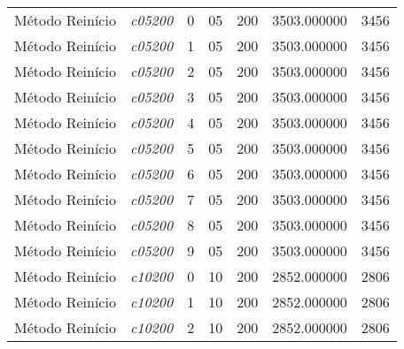 {\begin{longtable}{cc|c|cc|cc}
			Método Reinício    & \textit{c05200}    & 0                               & 05               & 200              & 3503.000000                          & 3456 \\ 
			Método Reinício    & \textit{c05200}    & 1                               & 05               & 200              & 3503.000000                          & 3456 \\ 
			Método Reinício    & \textit{c05200}    & 2                               & 05               & 200              & 3503.000000                          & 3456 \\ 
			Método Reinício    & \textit{c05200}    & 3                               & 05               & 200              & 3503.000000                          & 3456 \\ 
			Método Reinício    & \textit{c05200}    & 4                               & 05               & 200              & 3503.000000                          & 3456 \\ 
			Método Reinício    & \textit{c05200}    & 5                               & 05               & 200              & 3503.000000                          & 3456 \\ 
			Método Reinício    & \textit{c05200}    & 6                               & 05               & 200              & 3503.000000                          & 3456 \\ 
			Método Reinício    & \textit{c05200}    & 7                               & 05               & 200              & 3503.000000                          & 3456 \\ 
			Método Reinício    & \textit{c05200}    & 8                               & 05               & 200              & 3503.000000                          & 3456 \\ 
			Método Reinício    & \textit{c05200}    & 9                               & 05               & 200              & 3503.000000                          & 3456 \\ \hline
			Método Reinício    & \textit{c10200}    & 0                               & 10               & 200              & 2852.000000                          & 2806 \\ 
			Método Reinício    & \textit{c10200}    & 1                               & 10               & 200              & 2852.000000                          & 2806 \\ 
			Método Reinício    & \textit{c10200}    & 2                               & 10               & 200              & 2852.000000                          & 2806 \\ 

\end{longtable}}
